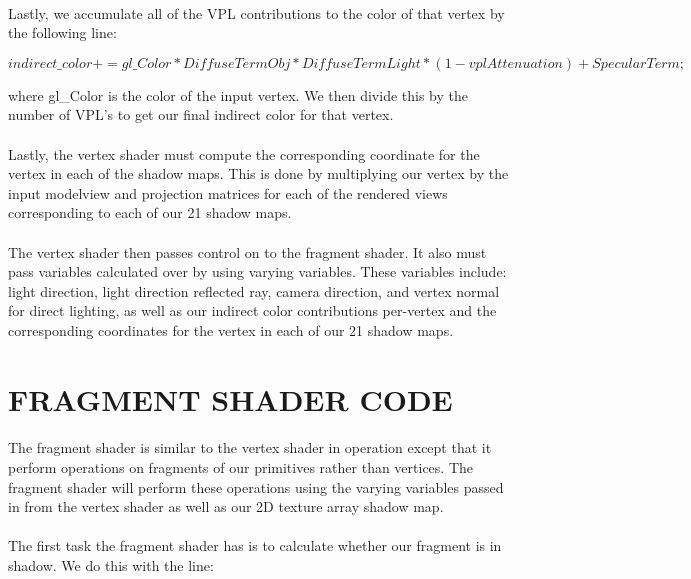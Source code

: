 \paragraph{}
Lastly, we accumulate all of the VPL contributions to the color of that vertex by the following line:

\begin{dmath}
indirect\_color += gl\_Color*DiffuseTermObj*DiffuseTermLight
	*(1-vplAttenuation)+SpecularTerm;
\end{dmath}

where gl\_Color is the color of the input vertex.  We then divide this by the number of VPL's to get our final indirect color for that vertex.

\paragraph{}
Lastly, the vertex shader must compute the corresponding coordinate for the vertex in each of the shadow maps.  This is done by multiplying our vertex by the input modelview and projection matrices for each of the rendered views corresponding to each of our 21 shadow maps.

\paragraph{}
The vertex shader then passes control on to the fragment shader.  It also must pass variables calculated over by using varying variables.  These variables include: light direction, light direction reflected ray, camera direction, and vertex normal for direct lighting, as well as our indirect color contributions per-vertex and the corresponding coordinates for the vertex in each of our 21 shadow maps.

\section{FRAGMENT SHADER CODE}
\paragraph{}
The fragment shader is similar to the vertex shader in operation except that it perform operations on fragments of our primitives rather than vertices.  The fragment shader will perform these operations using the varying variables passed in from the vertex shader as well as our 2D texture array shadow map.

\paragraph{}
The first task the fragment shader has is to calculate whether our fragment is in shadow.  We do this with the line:

